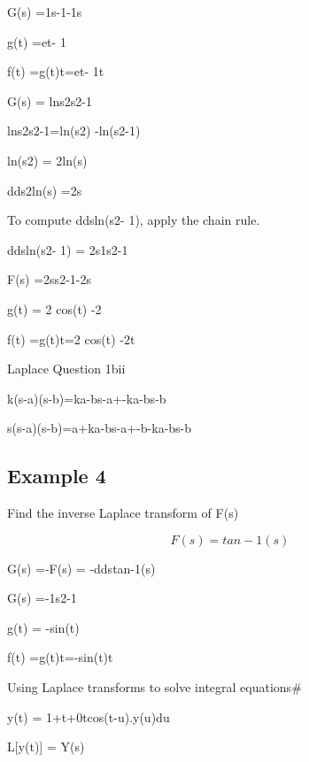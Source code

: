 G(s) =1s-1-1s


g(t) =et- 1


f(t) =g(t)t=et- 1t



 

G(s) = lns2s2-1


 lns2s2-1=ln(s2) -ln(s2-1)


ln(s2) = 2ln(s)



dds2ln(s) =2s



To compute  ddsln(s2- 1), apply the chain rule.



ddsln(s2- 1) = 2s1s2-1 


 F(s) =2ss2-1-2s



 g(t) = 2 cos(t) -2


f(t) =g(t)t=2 cos(t) -2t


Laplace Question 1bii

 

 

k(s-a)(s-b)=ka-bs-a+-ka-bs-b

 

 

s(s-a)(s-b)=a+ka-bs-a+-b-ka-bs-b

\subsection*{Example 4}
Find the inverse Laplace transform of  F(s)


\[ F(s) =tan-1(s)\]


G(s) =-F(s) = -ddstan-1(s)


G(s) =-1s2-1


g(t) = -sin(t)


f(t) =g(t)t=-sin(t)t

 

\newpage 

Using Laplace transforms to solve integral equations#

 

 y(t) = 1+t+0tcos(t-u).y(u)du

 

L[y(t)] = Y(s)

 


